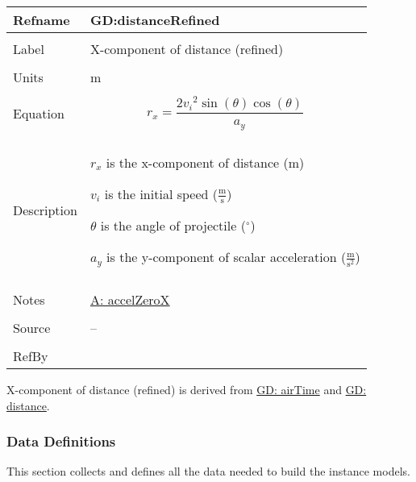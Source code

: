 \documentclass[12pt]{article}
\begin{document}
\noindent \begin{minipage}{\textwidth}
\begin{tabular}{p{} p{}}
\toprule \textbf{Refname} & \textbf{GD:distanceRefined}
\label{GD:distanceRefined}
\\ \midrule \\
Label & X-component of distance (refined)
\\ \midrule \\
Units & m
\\ \midrule \\
Equation & \begin{displaymath}
           {r_{x}}=\frac{2 {v_{i}}^{2} \sin\left(θ\right) \cos\left(θ\right)}{{a_{y}}}
           \end{displaymath}
\\ \midrule \\
Description & \begin{symbDescription}
              \item{${r_{x}}$ is the x-component of distance (m)}
              \item{${v_{i}}$ is the initial speed ($\frac{\text{m}}{\text{s}}$)}
              \item{$θ$ is the angle of projectile (${}^{\circ}$)}
              \item{${a_{y}}$ is the y-component of scalar acceleration ($\frac{\text{m}}{\text{s}^{2}}$)}
              \end{symbDescription}
\\ \midrule \\
Notes & \hyperref[accelZeroX]{A: accelZeroX}
\\ \midrule \\
Source & --
\\ \midrule \\
RefBy & 
\\ \bottomrule \end{tabular}
\end{minipage}
X-component of distance (refined) is derived from \hyperref[GD:airTime]{GD: airTime} and \hyperref[GD:distance]{GD: distance}.
\subsubsection{Data Definitions}
\label{Sec:DDs}
This section collects and defines all the data needed to build the instance models.
\par~
\end{document}
